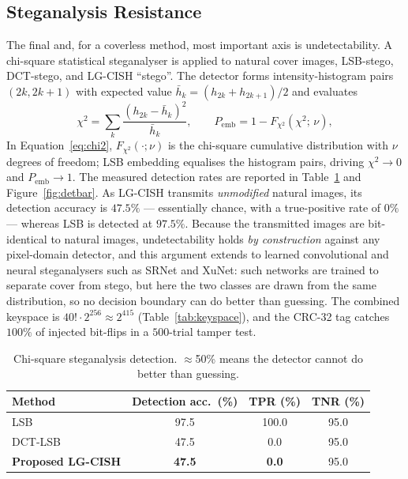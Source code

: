 \documentclass[11pt]{article}
\begin{document}
\subsection{Steganalysis Resistance}\label{sec:steganalysis}
The final and, for a coverless method, most important axis is undetectability. A
chi-square statistical steganalyser is applied to natural cover images, LSB-stego,
DCT-stego, and LG-CISH ``stego''. The detector forms intensity-histogram pairs
$(2k,2k{+}1)$ with expected value $\bar h_k=(h_{2k}+h_{2k+1})/2$ and evaluates
\begin{equation}
  \chi^2=\sum_{k}\frac{\left(h_{2k}-\bar h_k\right)^2}{\bar h_k},
  \qquad
  P_{\mathrm{emb}}=1-F_{\chi^2}\!\left(\chi^2;\,\nu\right),
  \label{eq:chi2}
\end{equation}
In Equation~\eqref{eq:chi2}, $F_{\chi^2}(\cdot;\nu)$ is the chi-square cumulative
distribution with $\nu$
degrees of freedom; LSB embedding equalises the histogram pairs, driving
$\chi^2\!\to\!0$ and $P_{\mathrm{emb}}\!\to\!1$. The measured detection rates are
reported in Table~\ref{tab:steg} and Figure~\ref{fig:detbar}. As LG-CISH transmits
\emph{unmodified} natural images, its detection accuracy is $47.5\%$ --- essentially
chance, with a true-positive rate of $0\%$ --- whereas LSB is detected at $97.5\%$.
Because the transmitted images are bit-identical to natural images, undetectability
holds \emph{by construction} against any pixel-domain detector, and this argument
extends to learned convolutional and neural steganalysers such as SRNet and XuNet:
such networks are trained to separate cover from stego, but here the two classes are
drawn from the same distribution, so no decision boundary can do better than
guessing. The combined keyspace is $40!\cdot2^{256}\approx2^{415}$
(Table~\ref{tab:keyspace}), and the CRC-32 tag catches $100\%$ of injected bit-flips
in a $500$-trial tamper test.

\begin{table}[H]
\centering
\caption{Chi-square steganalysis detection. $\approx$50\% means the detector cannot do better than guessing.}\label{tab:steg}
\begin{tabular}{@{}lccc@{}}
\toprule
Method & Detection acc.\ (\%) & TPR (\%) & TNR (\%) \\
\midrule
LSB              & 97.5 & 100.0 & 95.0 \\
DCT-LSB          & 47.5 & 0.0 & 95.0 \\
\textbf{Proposed LG-CISH} & \textbf{47.5} & \textbf{0.0} & 95.0 \\
\bottomrule
\end{tabular}
\end{table}
\end{document}
